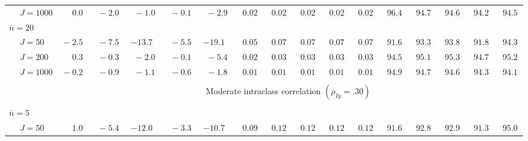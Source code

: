 \begin{sidewaystable}
\begin{threeparttable}
\begin{tabular}{llccccccccccccccc}
 & \nopagebreak $\;J=1000$  & $\phantom{0}\phantom{-}0.0\phantom{0}$ & $\phantom{0}{-}2.0\phantom{0}$ & $\phantom{0}{-}1.0\phantom{0}$ & $\phantom{0}{-}0.1\phantom{0}$ & $\phantom{0}{-}2.9\phantom{0}$ & $\phantom{0}0.02\phantom{0}$ & $\phantom{0}0.02\phantom{0}$ & $\phantom{0}0.02\phantom{0}$ & $\phantom{0}0.02\phantom{0}$ & $\phantom{0}0.02\phantom{0}$ & $\phantom{0}96.4\phantom{0}$ & $\phantom{0}94.7\phantom{0}$ & $\phantom{0}94.6\phantom{0}$ & $\phantom{0}94.2\phantom{0}$ & $\phantom{0}94.5\phantom{0}$ \\
\multicolumn{4}{l}{$\bar{n}=20$} \\  & \nopagebreak $\;J=50$  & $\phantom{0}{-}2.5\phantom{0}$ & $\phantom{0}{-}7.5\phantom{0}$ & ${-}13.7\phantom{0}$ & $\phantom{0}{-}5.5\phantom{0}$ & ${-}19.1\phantom{0}$ & $\phantom{0}0.05\phantom{0}$ & $\phantom{0}0.07\phantom{0}$ & $\phantom{0}0.07\phantom{0}$ & $\phantom{0}0.07\phantom{0}$ & $\phantom{0}0.07\phantom{0}$ & $\phantom{0}91.6\phantom{0}$ & $\phantom{0}93.3\phantom{0}$ & $\phantom{0}93.8\phantom{0}$ & $\phantom{0}91.8\phantom{0}$ & $\phantom{0}94.3\phantom{0}$ \\
 & \nopagebreak $\;J=200$  & $\phantom{0}\phantom{-}0.3\phantom{0}$ & $\phantom{0}{-}0.3\phantom{0}$ & $\phantom{0}{-}2.0\phantom{0}$ & $\phantom{0}{-}0.1\phantom{0}$ & $\phantom{0}{-}5.4\phantom{0}$ & $\phantom{0}0.02\phantom{0}$ & $\phantom{0}0.03\phantom{0}$ & $\phantom{0}0.03\phantom{0}$ & $\phantom{0}0.03\phantom{0}$ & $\phantom{0}0.03\phantom{0}$ & $\phantom{0}94.5\phantom{0}$ & $\phantom{0}95.1\phantom{0}$ & $\phantom{0}95.3\phantom{0}$ & $\phantom{0}94.7\phantom{0}$ & $\phantom{0}95.2\phantom{0}$ \\
 & \nopagebreak $\;J=1000$  & $\phantom{0}{-}0.2\phantom{0}$ & $\phantom{0}{-}0.9\phantom{0}$ & $\phantom{0}{-}1.1\phantom{0}$ & $\phantom{0}{-}0.6\phantom{0}$ & $\phantom{0}{-}1.8\phantom{0}$ & $\phantom{0}0.01\phantom{0}$ & $\phantom{0}0.01\phantom{0}$ & $\phantom{0}0.01\phantom{0}$ & $\phantom{0}0.01\phantom{0}$ & $\phantom{0}0.01\phantom{0}$ & $\phantom{0}94.9\phantom{0}$ & $\phantom{0}94.7\phantom{0}$ & $\phantom{0}94.6\phantom{0}$ & $\phantom{0}94.3\phantom{0}$ & $\phantom{0}94.1\phantom{0}$ \\
[0.5ex]\hline\\[-1.6ex] 
& & \multicolumn{15}{c}{Moderate intraclass correlation $(\rho_{Iy}=.30)$} \\[0.6ex]\hline\\[-1.8ex]
\multicolumn{4}{l}{$\bar{n}=5$} \\  & \nopagebreak $\;J=50$  & $\phantom{0}\phantom{-}1.0\phantom{0}$ & $\phantom{0}{-}5.4\phantom{0}$ & ${-}12.0\phantom{0}$ & $\phantom{0}{-}3.3\phantom{0}$ & ${-}10.7\phantom{0}$ & $\phantom{0}0.09\phantom{0}$ & $\phantom{0}0.12\phantom{0}$ & $\phantom{0}0.12\phantom{0}$ & $\phantom{0}0.12\phantom{0}$ & $\phantom{0}0.12\phantom{0}$ & $\phantom{0}91.6\phantom{0}$ & $\phantom{0}92.8\phantom{0}$ & $\phantom{0}92.9\phantom{0}$ & $\phantom{0}91.3\phantom{0}$ & $\phantom{0}95.0\phantom{0}$ \\

\end{tabular}
\end{threeparttable}
\end{sidewaystable}
